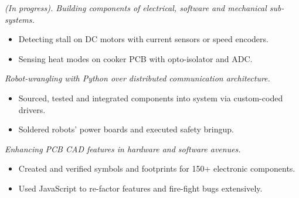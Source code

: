 \documentclass{resume}
\begin{document}
\textit{(In progress). Building components of electrical, software and mechanical sub-systems.}
\begin{itemize}
  \item Detecting stall on DC motors with current sensors or speed encoders.
  \item Sensing heat modes on cooker PCB with opto-isolator and ADC.
\end{itemize}

\textit{Robot-wrangling with Python over distributed communication architecture.}
\begin{itemize}
  \item Sourced, tested and integrated components into system via custom-coded drivers.
  \item Soldered robots' power boards and executed safety bringup.
\end{itemize}
\begin{comment}
  Informal intro to ML / N-nets, FK / IK, Grasping, FSM, DB (ES)
  People skills: pair-programming, 1-on-1, standups, blog posts, Happy Hour, AI planning, CI for internal processes, HW concept review
  Python fu: rapid prototyping / scripting AND enterprise-level code --> classes, exception-handling, logging, PDB debugging, linting, documentation
\end{comment}

\textit{Enhancing PCB CAD features in hardware and software avenues.}
\begin{itemize}
    \item Created and verified symbols and footprints for 150+ electronic components.
    \item Used JavaScript to re-factor features and fire-fight bugs extensively.
\end{itemize}
\begin{comment}
  Adjusted prioritization of design rules in layout constraint manager.
  Fixed incorrect drawing and positioning of constraint violation layout bodies.
  Re-factored event-listening logic for drawing nets in schematic editor.
  Corrected pin manager's oversight in tracking connection mappings.
  Enabled efficient BGA row enumeration during footprint generation.
\end{comment}
\end{document}
